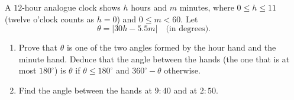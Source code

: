 A $12$-hour analogue clock shows $h$ hours and $m$ minutes, where $0\le h\le11$ (twelve o'clock counts as $h=0$) and $0\le m<60$. Let
\[\theta=\left|30h-5.5m\right|\quad\text{(in degrees)}.\]
\begin{enumerate}
\item[(a)] Prove that $\theta$ is one of the two angles formed by the hour hand and the minute hand. Deduce that the angle between the hands (the one that is at most $180^\circ$) is $\theta$ if $\theta\le180^\circ$ and $360^\circ-\theta$ otherwise.
\item[(b)] Find the angle between the hands at $9{:}40$ and at $2{:}50$.
\end{enumerate}
